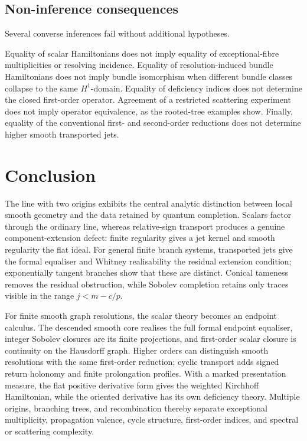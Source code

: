 \documentclass[11pt]{article}
\theoremstyle{plain}
\theoremstyle{definition}
\begin{document}
\subsection{Non-inference consequences}
\label{subsec:detectability-noninference}

Several converse inferences fail without additional hypotheses.

Equality of scalar Hamiltonians does not imply equality of
exceptional-fibre multiplicities or resolving incidence. Equality of
resolution-induced bundle Hamiltonians does not imply bundle isomorphism when
different bundle classes collapse to the same \(H^1\)-domain. Equality of
deficiency indices does not determine the closed first-order operator.
Agreement of a restricted scattering experiment does not imply operator
equivalence, as the rooted-tree examples show. Finally, equality of the
conventional first- and second-order reductions does not determine higher
smooth transported jets.



\section{Conclusion}
\label{sec:conclusion}

The line with two origins exhibits the central analytic distinction between local smooth geometry and the data retained by quantum completion. Scalars factor through the ordinary line, whereas relative-sign transport produces a genuine component-extension defect: finite regularity gives a jet kernel and smooth regularity the flat ideal. For general finite branch systems, transported jets give the formal equaliser and Whitney realisability the residual extension condition; exponentially tangent branches show that these are distinct. Conical tameness removes the residual obstruction, while Sobolev completion retains only traces visible in the range \(j<m-c/p\).

For finite smooth graph resolutions, the scalar theory becomes an endpoint calculus. The descended smooth core realises the full formal endpoint equaliser, integer Sobolev closures are its finite projections, and first-order scalar closure is continuity on the Hausdorff graph. Higher orders can distinguish smooth resolutions with the same first-order reduction; cyclic transport adds signed return holonomy and finite prolongation profiles. With a marked presentation measure, the flat positive derivative form gives the weighted Kirchhoff Hamiltonian, while the oriented derivative has its own deficiency theory. Multiple origins, branching trees, and recombination thereby separate exceptional multiplicity, propagation valence, cycle structure, first-order indices, and spectral or scattering complexity.
\end{document}
